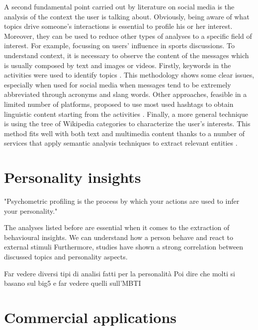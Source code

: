 A second fundamental point carried out by literature on social media is the analysis of the context the user is talking about.
Obviously, being aware of what topics drive someone's interactions is essential to profile his or her interest. 
Moreover, they can be used to reduce other types of analyses to a specific field of interest. For example, focussing on users' influence in sports discussions.
To understand context, it is necessary to observe the content of the messages which is usually composed by text and images or videos.
Firstly, keywords in the activities were used to identify topics \cite{cha2010measuring}. This methodology shows some clear issues, especially when used for social media when messages tend to be extremely abbreviated through acronyms and slang words.
Other approaches, feasible in a limited number of platforms, proposed to use most used hashtags to obtain linguistic content starting from the activities \cite{pennacchiotti2011machine}.
Finally, a more general technique is using the tree of Wikipedia categories to characterize the user's interests. 
This method fits well with both text and multimedia content thanks to a number of services that apply semantic analysis techniques to extract relevant entities \cite{torrero2018wikipedia}. 

\section{Personality insights}
"Psychometric profiling is the process by which your actions are used to infer your personality."

The analyses listed before are essential when it comes to the extraction of behavioural insights. We can understand how a person behave and react to external stimuli
Furthermore, studies have shown a strong correlation between discussed topics and personality aspects.


Far vedere diversi tipi di analisi fatti per la personalità
Poi dire che molti si basano sul big5 e far vedere quelli sull'MBTI
\section{Commercial applications}
